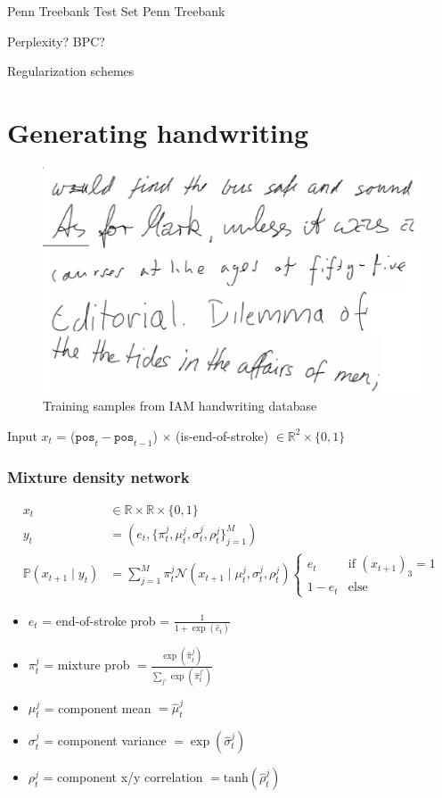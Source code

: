 \documentclass[10pt,xcolor=dvipsnames]{beamer}
\begin{document}
\begin{frame}{Penn Treebank Test Set}
  Penn Treebank

  Perplexity? BPC?

  Regularization schemes
\end{frame}

\section{Generating handwriting}
\begin{frame}
  \begin{figure}
    \centering
  \includegraphics[width=.75\linewidth]{fig/fig9.png}
    \caption{Training samples from IAM handwriting database}
    \label{fig:fig9}
  \end{figure}
Input $x_t$ = ($\texttt{pos}_t - \texttt{pos}_{t-1}$) $\times$
(is-end-of-stroke) $ \in \mathbb{R}^2 \times \{0,1\}$
\end{frame}

\begin{frame}
  \frametitle{Mixture density network}
  \begin{align*}
   x_t &\in \mathbb{R} \times \mathbb{R} \times \{0,1\}  \\
    y_t &= (e_t, \{\pi^j_t, \mu^j_t, \sigma^j_t, \rho^j_t\}_{j=1}^M) \\
    \mathbb{P}(x_{t+1} \mid y_t) &= \sum_{j=1}^M \pi^j_t \mathcal{N}(x_{t+1} \mid \mu^j_t, \sigma^j_t, \rho^j_t)
    \begin{cases}
      e_t & \text{if } (x_{t+1})_3 = 1 \\
      1-e_t & \text{else}
    \end{cases}
  \end{align*}

  \begin{itemize}
  \item $e_t$ = end-of-stroke prob = $\frac1{1+\exp(\hat{e}_t)}$
  \item $\pi^j_t$ = mixture prob $= \frac{\exp(\hat{\pi}_t^j)}{\sum_{j'}\exp(\hat{\pi}_t^{j'})}$
  \item $\mu^j_t$ = component mean $= \hat{\mu}^j_t$
  \item $\sigma^j_t$ = component variance $= \exp(\hat{\sigma}_t^j)$
  \item $\rho^j_t$ = component x/y correlation $= \text{tanh}(\hat{\rho}^j_t)$
  \end{itemize}
\end{frame}
\end{document}
